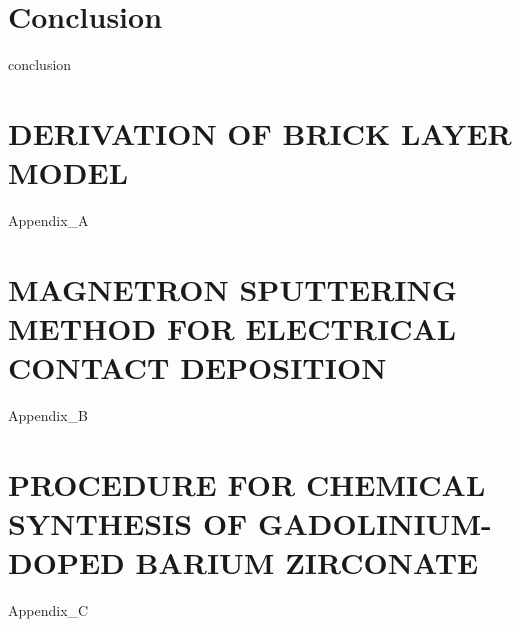 \documentclass[phd, reqno]{uab-thesis}   %
\begin{document}
\chapter{Conclusion}
\label{ch:conclusions}
{conclusion}

{\setlength\bibitemsep{12pt}\singlespacing\printbibliography[title={LIST OF REFERENCES\bigskip}]}



\captionsetup{list=no}

\appendix
\chapter{\MakeUppercase{Derivation of Brick Layer Model}}
{Appendix_A}
\chapter{\MakeUppercase{Magnetron Sputtering Method for Electrical Contact Deposition}}
{Appendix_B}
\chapter{\MakeUppercase{Procedure for Chemical Synthesis of Gadolinium-doped Barium Zirconate}}
{Appendix_C}
\end{document}
